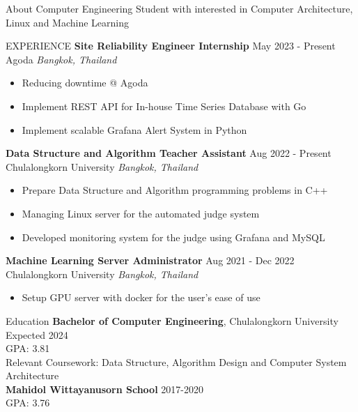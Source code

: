 \documentclass{resume} %
\begin{document}
\begin{rSection}{About}
    {Computer Engineering Student with interested in Computer Architecture, Linux and Machine Learning}
\end{rSection}

\begin{rSection}{EXPERIENCE}
    \textbf{Site Reliability Engineer Internship} \hfill May 2023 - Present\\
    Agoda \hfill \textit{Bangkok, Thailand}
    \begin{itemize}
        \item Reducing downtime @ Agoda
        \item Implement REST API for In-house Time Series Database with Go
        \item Implement scalable Grafana Alert System in Python
    \end{itemize}
    \textbf{Data Structure and Algorithm Teacher Assistant} \hfill Aug 2022 - Present\\
    Chulalongkorn University \hfill \textit{Bangkok, Thailand}
    \begin{itemize}
        \itemsep -3pt {}
        \item Prepare Data Structure and Algorithm programming problems in C++
        \item Managing Linux server for the automated judge system
        \item Developed monitoring system for the judge using Grafana and MySQL
    \end{itemize}
    \textbf{Machine Learning Server Administrator} \hfill Aug 2021 - Dec 2022\\
    Chulalongkorn University \hfill \textit{Bangkok, Thailand}
    \begin{itemize}
        \itemsep -3pt {}
        \item Setup GPU server with docker for the user's ease of use
    \end{itemize}
\end{rSection}

\begin{rSection}{Education}
    {\bf Bachelor of Computer Engineering}, Chulalongkorn University  \hfill {Expected 2024}\\
    GPA: 3.81\\
    Relevant Coursework: Data Structure, Algorithm Design and Computer System Architecture\\
    {\bf Mahidol Wittayanusorn School} \hfill {2017-2020}\\
    GPA: 3.76
\end{rSection}
\end{document}
